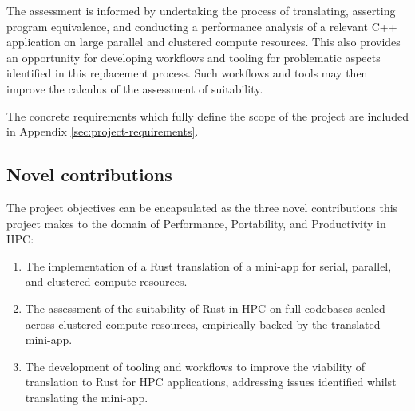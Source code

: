 The assessment is informed by undertaking the process of translating, asserting program equivalence, and conducting a performance analysis of a relevant C++ application on large parallel and clustered compute resources. This also provides an opportunity for developing workflows and tooling for problematic aspects identified in this replacement process. Such workflows and tools may then improve the calculus of the assessment of suitability.

The concrete requirements which fully define the scope of the project are included in Appendix \ref{sec:project-requirements}.

\subsection{Novel contributions}
\label{ssec:objectives-novel-contributions}

The project objectives can be encapsulated as the three novel contributions this project makes to the domain of Performance, Portability, and Productivity in \acrshort{HPC}:

\begin{enumerate}
    \item The implementation of a Rust translation of a \acrshort{mini-app} for serial, parallel, and clustered compute resources.
    \item The assessment of the suitability of Rust in HPC on full codebases scaled across clustered compute resources, empirically backed by the translated \acrshort{mini-app}.
    \item The development of tooling and workflows to improve the viability of translation to Rust for HPC applications, addressing issues identified whilst translating the \acrshort{mini-app}.
\end{enumerate}
